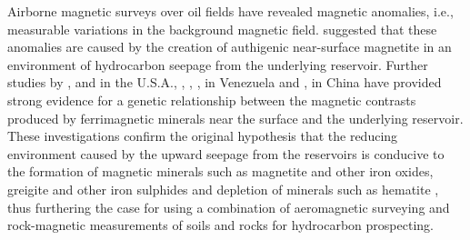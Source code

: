 Airborne magnetic surveys over oil fields \citep{Donovan1979} have revealed magnetic anomalies, i.e., measurable variations in the background magnetic field. \citet{Donovan1979} suggested that these anomalies are caused by the creation of authigenic near-surface magnetite in an environment of hydrocarbon seepage from the underlying reservoir. Further studies by \citet{Donovan1984}, \citet{Elmore1993} and \citet{Reynolds1993} in the U.S.A., \citet{Diaz2000}, \citet{Costanzo2006,Costanzo2012}, \citet{Gonzalez2002}, \citet{Guzman2011} in Venezuela and \citet{Liu1999}, \citet{Liu2004,Liu2006} in China have provided strong evidence for a genetic relationship between the magnetic contrasts produced by ferrimagnetic minerals near the surface and the underlying reservoir. These investigations confirm the original hypothesis \citep{Donovan1979} that the reducing environment caused by the upward seepage from the reservoirs is conducive to the formation of magnetic minerals such as magnetite and other iron oxides, greigite and other iron sulphides and depletion of minerals such as hematite \citep{Machel1991}, thus furthering the case for using a combination of aeromagnetic surveying and rock-magnetic measurements of soils and rocks for hydrocarbon prospecting.\par


